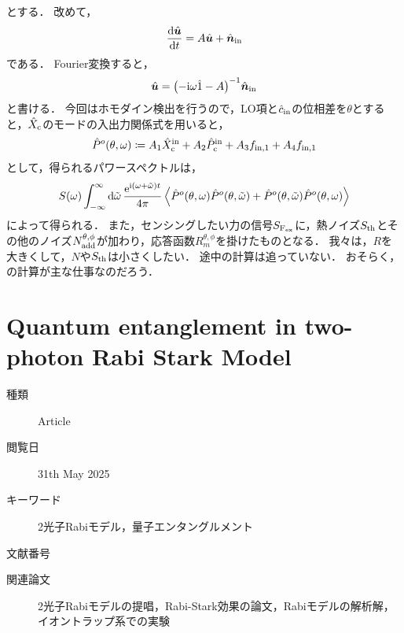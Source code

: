 \documentclass{report}
\begin{document}
    とする．
    改めて，
    \begin{align}
      \dv{\hat{\bm{u}}}{t} = A\hat{\bm{u}} + \hat{\bm{n}}_{\mathrm{in}}
    \end{align}
    である．
    Fourier変換すると，
    \begin{align}
      \hat{\bm{u}} = \qty(-\mathrm{i}\omega\hat{1} - A)^{-1}\hat{\bm{n}}_{\mathrm{in}}
    \end{align}
    と書ける．
    今回はホモダイン検出を行うので，LO項と$\hat{c}_{\mathrm{in}}$の位相差を$\theta$とすると，$\hat{X}_{\mathrm{c}}$のモードの入出力関係式を用いると，
    \begin{align}
      \hat{P}^o(\theta, \omega)\coloneqq A_1\hat{X}^{\mathrm{in}}_{\mathrm{c}} + A_2\hat{P}^{\mathrm{in}}_{\mathrm{c}} + A_3f_{\mathrm{in, 1}} + A_4f_{\mathrm{in, 1}} \label{PhysRevA.111.053508-main-work}
    \end{align}
    として，得られるパワースペクトルは，
    \begin{align}
      S(\omega) \int_{-\infty}^{\infty}\dd{\tilde{\omega}}\frac{\e^{\i\qty(\omega + \tilde{\omega})t}}{4\pi}\ev{\hat{P}^o(\theta, \omega)\hat{P}^o(\theta, \tilde{\omega}) + \hat{P}^o(\theta, \tilde{\omega})\hat{P}^o(\theta, \omega)}
    \end{align}
    によって得られる．
    また，センシングしたい力の信号$S_{\mathrm{F_{ex}}}$に，熱ノイズ$S_{\mathrm{th}}$とその他のノイズ$N^{\theta, \phi}_{\mathrm{add}}$が加わり，応答函数$R^{\theta, \phi}_m$を掛けたものとなる．
    我々は，$R$を大きくして，$N$や$S_{\mathrm{th}}$は小さくしたい．
    途中の計算は追っていない．
    おそらく，の計算が主な仕事なのだろう．
  \chapter{Quantum entanglement in two-photon Rabi Stark Model}
    \begin{boxnote}
      \begin{description}
        \item[種類] Article
        \item[閲覧日] 31th May 2025
        \item[キーワード] 2光子Rabiモデル，量子エンタングルメント
        \item[文献番号] \cite{boutakkaQuantumEntanglementTwophoton2025}
        \item[関連論文] 2光子Rabiモデルの提唱\cite{hammaniTwophotonQuantumRabi2023}，Rabi-Stark効果の論文\cite{grimsmoCavityQEDSimulationQubitoscillator2013a}，Rabiモデルの解析解\cite{braakIntegrabilityRabiModel2011a}，イオントラップ系での実験\cite{congSelectiveInteractionsQuantum2020}
      \end{description}
    \end{boxnote}
\end{document}
